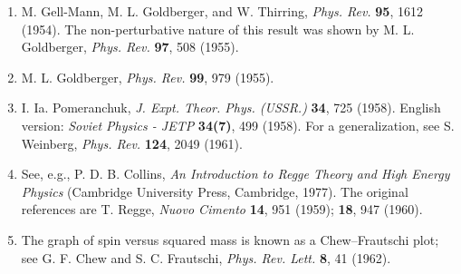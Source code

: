 \begin{enumerate}
\item \label{ref:10.14}M. Gell-Mann, M. L. Goldberger, and W. Thirring,
\emph{Phys. Rev.} \textbf{95}, 1612 (1954). The non-perturbative nature of this
result was shown by M. L. Goldberger, \emph{Phys. Rev.} \textbf{97}, 508 (1955).

\item \label{ref:10.15}M. L. Goldberger, \emph{Phys. Rev.} \textbf{99}, 979
(1955).

\item \label{ref:10.16}I. Ia. Pomeranchuk, \emph{J. Expt. Theor. Phys. (USSR.)}
\textbf{34}, 725 (1958). English version: \emph{Soviet Physics - JETP}
\textbf{34(7)}, 499 (1958). For a generalization, see S. Weinberg,
\emph{Phys. Rev.} \textbf{124}, 2049 (1961).

\item \label{ref:10.17}See, e.g., P. D. B. Collins, \emph{An Introduction to
Regge Theory and High Energy Physics} (Cambridge University Press, Cambridge,
1977). The original references are T. Regge, \emph{Nuovo Cimento} \textbf{14},
951 (1959); \textbf{18}, 947 (1960).

\item \label{ref:10.18}The graph of spin versus squared mass is known as a
Chew--Frautschi plot; see G. F. Chew and S. C. Frautschi, \emph{Phys. Rev.
Lett.} \textbf{8}, 41 (1962).
\end{enumerate}
